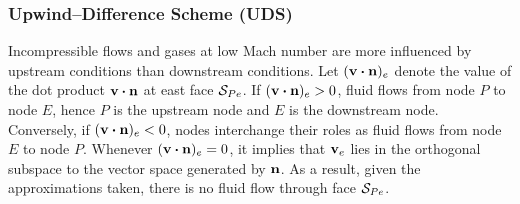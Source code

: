 \subsubsection{Upwind--Difference Scheme (UDS)}

Incompressible flows and gases at low Mach number are more influenced by
upstream conditions than downstream conditions. Let $(\vb{v} \vdot \vb{n})_e$
denote the value of the dot product $\vb{v} \vdot \vb{n}$ at east face
$\mathcal{S}_{Pe}$. If $(\vb{v} \vdot \vb{n})_e > 0$, fluid flows from node $P$ to node
$E$, hence $P$ is the upstream node and $E$ is the downstream node. Conversely,
if $(\vb{v} \vdot \vb{n})_e < 0$, nodes interchange their roles as fluid flows
from node $E$ to node $P$. Whenever $(\vb{v} \vdot \vb{n})_e = 0$, it implies
that $\vb{v}_e$ lies in the orthogonal subspace to the vector space generated by
$\vb{n}$. As a result, given the approximations taken, there is no fluid flow
through face $\mathcal{S}_{Pe}$.

